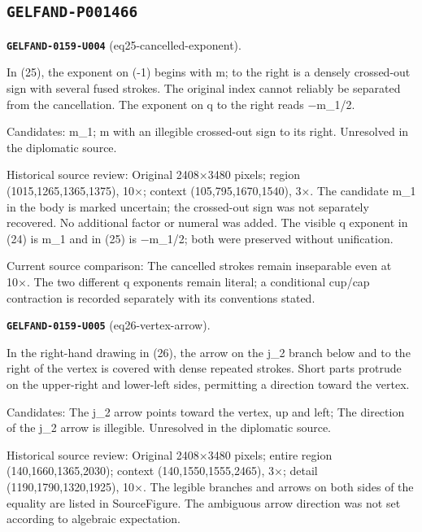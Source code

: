 \subsection*{\texttt{GELFAND-P001466}}
\par\noindent\leavevmode{}\label{GELFAND-0159-U004}\label{GELFAND-P001466:eq25-cancelled-exponent}\textbf{\texttt{GELFAND-0159-U004}} (eq25-cancelled-exponent).\nopagebreak[4]\par
In (25), the exponent on (-1) begins with m; to the right is a densely crossed-out sign with several fused strokes. The original index cannot reliably be separated from the cancellation. The exponent on q to the right reads −m\_1/2.\par
Candidates: m\_1; m with an illegible crossed-out sign to its right. Unresolved in the diplomatic source.\par
Historical source review: Original 2408×3480 pixels; region (1015,1265,1365,1375), 10×; context (105,795,1670,1540), 3×. The candidate m\_1 in the body is marked uncertain; the crossed-out sign was not separately recovered. No additional factor or numeral was added. The visible q exponent in (24) is m\_1 and in (25) is −m\_1/2; both were preserved without unification.\par
Current source comparison: The cancelled strokes remain inseparable even at 10×. The two different q exponents remain literal; a conditional cup/cap contraction is recorded separately with its conventions stated.\par\medskip
\par\noindent\leavevmode{}\label{GELFAND-0159-U005}\label{GELFAND-P001466:eq26-vertex-arrow}\textbf{\texttt{GELFAND-0159-U005}} (eq26-vertex-arrow).\nopagebreak[4]\par
In the right-hand drawing in (26), the arrow on the j\_2 branch below and to the right of the vertex is covered with dense repeated strokes. Short parts protrude on the upper-right and lower-left sides, permitting a direction toward the vertex.\par
Candidates: The j\_2 arrow points toward the vertex, up and left; The direction of the j\_2 arrow is illegible. Unresolved in the diplomatic source.\par
Historical source review: Original 2408×3480 pixels; entire region (140,1660,1365,2030); context (140,1550,1555,2465), 3×; detail (1190,1790,1320,1925), 10×. The legible branches and arrows on both sides of the equality are listed in SourceFigure. The ambiguous arrow direction was not set according to algebraic expectation.\par
